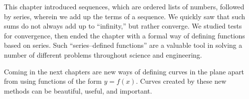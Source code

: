 This chapter introduced sequences, which are ordered lists of numbers, followed by series, wherein we add up the terms of a sequence. We quickly saw that such sums do not always add up to ``infinity,'' but rather converge. We studied tests for convergence, then ended the chapter with a formal way of defining functions based on series. Such ``series--defined functions'' are a valuable tool in solving a number of different problems throughout science and engineering.

Coming in the next chapters are new ways of defining curves in the plane apart from using functions of the form $y=f(x)$. Curves created by these new methods can be beautiful, useful, and important. 


